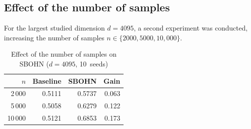 \subsection{Effect of the number of samples}

For the largest studied dimension $d = 4095$, a second experiment was conducted, increasing the number of samples $n \in \{2000, 5000, 10{,}000\}$.

\begin{table}[H]
\centering
\caption{Effect of the number of samples on SBOHN ($d=4095$, 10~seeds)}
\label{tab:scale_n}
\begin{tabular}{rrrr}
\toprule
$n$ & Baseline & SBOHN & Gain \\
\midrule
2\,000   & 0.5111 & 0.5737 & 0.063 \\
5\,000   & 0.5058 & 0.6279 & 0.122 \\
10\,000  & 0.5121 & 0.6853 & 0.173 \\
\bottomrule
\end{tabular}
\end{table}
